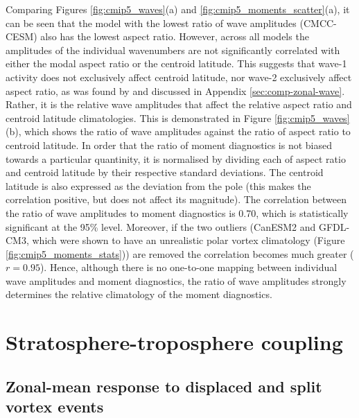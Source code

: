 Comparing Figures \ref{fig:cmip5_waves}(a) and
\ref{fig:cmip5_moments_scatter}(a), it can be seen that the model with the
lowest ratio of wave amplitudes (CMCC-CESM) also has the lowest aspect
ratio. However, across all models the amplitudes of the individual wavenumbers
are not significantly correlated with either the modal aspect ratio or the
centroid latitude. This suggests that wave-1 activity does not exclusively
affect centroid latitude, nor wave-2 exclusively affect aspect ratio, as was
found by \citet{Waugh1997} and discussed in Appendix
\ref{sec:comp-zonal-wave}. Rather, it is the relative wave amplitudes that
affect the relative aspect ratio and centroid latitude climatologies. This is
demonstrated in Figure \ref{fig:cmip5_waves}(b), which shows the ratio of wave
amplitudes against the ratio of aspect ratio to centroid latitude. In order that
the ratio of moment diagnostics is not biased towards a particular quantinity,
it is normalised by dividing each of aspect ratio and centroid latitude by their
respective standard deviations. The centroid latitude is also expressed as the
deviation from the pole (this makes the correlation positive, but does not
affect its magnitude). The correlation between the ratio of wave amplitudes to
moment diagnostics is 0.70, which is statistically significant at the 95\%
level. Moreover, if the two outliers (CanESM2 and GFDL-CM3, which were shown to
have an unrealistic polar vortex climatology (Figure
\ref{fig:cmip5_moments_stats})) are removed the correlation becomes much greater
($r=0.95$). Hence, although there is no one-to-one mapping between individual
wave amplitudes and moment diagnostics, the ratio of wave amplitudes strongly
determines the relative climatology of the moment diagnostics.



\section{Stratosphere-troposphere coupling}
\subsection{Zonal-mean response to displaced and split vortex events}

